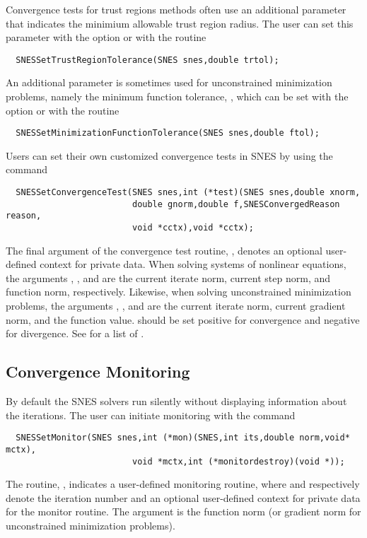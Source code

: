 Convergence tests for trust regions methods often use an additional
parameter that indicates the minimium allowable trust region radius.
The user can set this parameter with the option 
 or with the routine
\begin{verbatim}
  SNESSetTrustRegionTolerance(SNES snes,double trtol);
\end{verbatim}
An additional parameter is sometimes used for unconstrained minimization
problems, namely the minimum function tolerance, , which can
be set with the option   or
with the routine
\begin{verbatim}
  SNESSetMinimizationFunctionTolerance(SNES snes,double ftol);
\end{verbatim}

Users can set their own customized convergence tests in SNES by using
the command 
\begin{verbatim}
  SNESSetConvergenceTest(SNES snes,int (*test)(SNES snes,double xnorm,
                         double gnorm,double f,SNESConvergedReason reason,
                         void *cctx),void *cctx);
\end{verbatim}
The final argument of the convergence test routine, ,
denotes an optional user-defined context for private data.  When
solving systems of nonlinear equations, the arguments ,
, and  are the current iterate norm, current step
norm, and function norm, respectively.  Likewise, when solving
unconstrained minimization problems, the arguments , , and  are the current iterate norm, current gradient
norm, and the function value.  should be set positive
for convergence and negative for divergence. See 
for a list of . 

\subsection{Convergence Monitoring}
\label{sec:snesmonitor}

By default the SNES solvers run silently without displaying information
about the iterations. The user can initiate monitoring with the
command  
\begin{verbatim}
  SNESSetMonitor(SNES snes,int (*mon)(SNES,int its,double norm,void* mctx),
                         void *mctx,int (*monitordestroy)(void *));
\end{verbatim}
The routine, , indicates a user-defined monitoring routine,
where  and  respectively denote the iteration
number and an optional user-defined context for private data for the
monitor routine.  The argument  is the function norm (or
gradient norm for unconstrained minimization problems).

